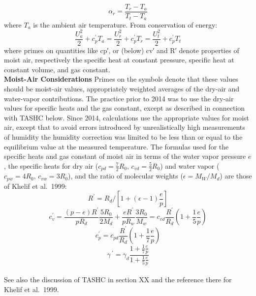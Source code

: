 \documentclass[
  english,
]{book}
\begin{document}
\begin{equation}
\alpha_{r}=\frac{T_{r}-T_{a}}{T_{t}-T_{a}}
\label{eq:alphar}
\end{equation}
where \(T_a\) is the ambient air temperature. From conservation of energy:\\
\begin{equation}
\frac{U_{a}^{2}}{2}+c_{p}^{\prime}T_{a}=\frac{U_{r}^{2}}{2}+c_{p}^{\prime}T_{r}=\frac{U_{t}^{2}}{2}+c_{p}^{\prime}T_{t}
\label{eq:Ua}
\end{equation}
where primes on quantities like {cp′}, or (below) {cv′} and {R′} denote properties of moist air, respectively the specific heat at constant pressure, specific heat at constant volume, and gas constant.\\

\textbf{Moist-Air Considerations}
Primes on the symbols denote that these values should be moist-air
values, appropriately weighted averages of the dry-air and water-vapor
contributions. The practice prior to 2014 was to use the dry-air values
for specific heats and the gas constant, except as described in connection
with TASHC below. Since 2014, calculations use the appropriate values
for moist air, except that to avoid errors introduced by unrealistically
high measurements of humidity the humidity correction was limited
to be less than or equal to the equilibrium value at the measured
temperature. The formulas used for the specific heats and gas constant
of moist air in terms of the water vapor pressure \(e\), the specific
heats for dry air (\(c_{pd}=\frac{7}{2}R_{0},\,c_{vd}=\frac{5}{2}R_{0}\))
and water vapor (\(c_{pw}=4R_{0},\,c_{vw}=3R_{0}\)), and the ratio
of molecular weights (\(\epsilon=M_{W}/M_{d}\)) are those of Khelif
et al.~1999:\\
\begin{equation}
R^{\prime}=R_{d}/[1+(\epsilon-1)\frac{e}{p}]
\end{equation}
\begin{equation}
c_{v}^{\prime} = \frac{(p-e)R^{\prime}}{pR_{d}}\frac{5R_{0}}{2M_{d}}+\frac{eR^{\prime}}{pR_{w}}\frac{3R_{0}}{M_{w}}=c_{vd}\frac{R^{\prime}}{R_{d}}\left(1+\frac{1}{5}\frac{e}{p}\right)
\label{eq:cvMoist}
\end{equation}
\begin{equation}
c_{p}^{\prime} = c_{pd}\frac{R^{\prime}}{R_{d}}\left(1+\frac{1}{7}\frac{e}{p}\right)
\label{eq:cpMoist}
\end{equation}
\begin{equation}
\gamma\,^{\prime} = \gamma_{d}\frac{1+\frac{1}{7}\frac{e}{p}}{1+\frac{1}{5}\frac{e}{p}}
\label{eq:gammaMoist}
\end{equation}\\
See also the discussion of TASHC in section XX
and the reference there for Khelif et al.~1999.
\end{document}
